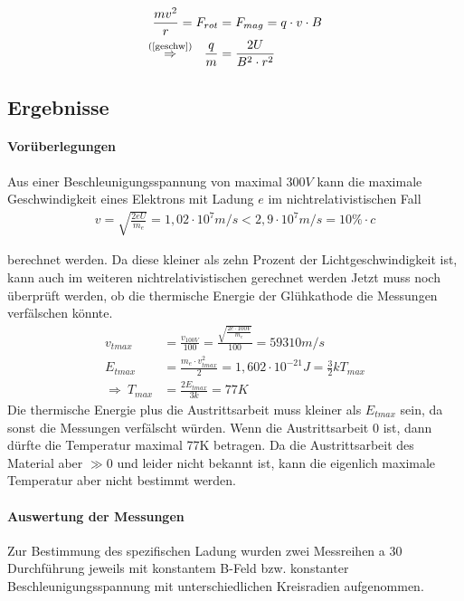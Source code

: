 \documentclass[11pt, a4paper]{article}
\begin{document}
    \begin{align}
        \frac{mv^2}{r} = F_{rot} &= F_{mag} = q \cdot v \cdot B \\
        \overset{\text{(\ref{geschw})}}{\Rightarrow} \ \  \frac{q}{m} &= \frac{2U}{B^2 \cdot r^2} \label{qm_formel}
    \end{align}

    \subsection{Ergebnisse}
    \paragraph{Vorüberlegungen}

    Aus einer Beschleunigungsspannung von maximal $300 \si{V}$ kann die maximale Geschwindigkeit eines Elektrons mit Ladung $e$ im nichtrelativistischen Fall
    \begin{align}
        v = \sqrt{\frac{2 e U}{m_e}} = 1,02 \cdot 10^{7} \si{m/s} < 2,9 \cdot 10^{7} \si{m/s} = 10\% \cdot c
    \end{align}


    berechnet werden. Da diese kleiner als zehn Prozent der Lichtgeschwindigkeit ist, kann auch im weiteren nichtrelativistischen gerechnet werden
    Jetzt muss noch überprüft werden, ob die thermische Energie der Glühkathode die Messungen verfälschen könnte.
    \begin{align}
        v_{tmax} &= \frac{v_{100V}}{100} = \frac{\sqrt{\frac{2 e \cdot 100 \si{V}}{m_e}}}{100} = 59310 \si{m \per s} \\
        E_{tmax} &= \frac{m_e \cdot v_{tmax}^2}{2} = 1,602 \cdot 10^{-21} \si{J} = \frac{3}{2} k T_{max} \\
        \Rightarrow \ T_{max} &= \frac{2 E_{tmax}}{3 k} = 77K
    \end{align}
    Die thermische Energie plus die Austrittsarbeit muss kleiner als $E_{tmax}$ sein, da sonst die Messungen verfälscht würden. Wenn die Austrittsarbeit $0$ ist, dann dürfte die Temperatur maximal 77K betragen. Da die Austrittsarbeit des Material aber $\gg0$ und leider nicht bekannt ist, kann die eigenlich maximale Temperatur aber nicht bestimmt werden.


    \paragraph{Auswertung der Messungen}
        Zur Bestimmung des spezifischen Ladung wurden zwei Messreihen a 30 Durchführung jeweils mit konstantem B-Feld bzw. konstanter Beschleunigungsspannung mit unterschiedlichen Kreisradien aufgenommen.
        
\end{document}
